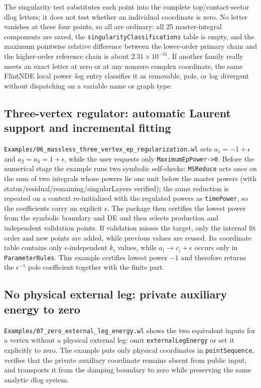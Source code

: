\documentclass[11pt,a4paper]{article}
\begin{document}
The singularity test substitutes each point into the complete top/contact-sector dlog letters; it
does not test whether an individual coordinate is zero. No letter vanishes at these four points,
so all are ordinary: all 25 master-integral components are saved, the
\texttt{singularityClassifications} table is empty, and the maximum pointwise relative difference
between the lower-order primary chain and the higher-order reference chain is about
$2.31\times10^{-31}$. If another family really meets an exact letter at zero or at any nonzero
complex coordinate, the same FlintNDE local power--log entry classifies it as removable, pole, or
log divergent without dispatching on a variable name or graph type.

\subsection{Three-vertex regulator: automatic Laurent support and incremental fitting}

\texttt{Examples/06\_massless\_three\_vertex\_ep\_regularization.wl} sets
$a_1=-1+\epsilon$ and $a_2=a_3=1+\epsilon$, while the user requests only \texttt{MaximumEpPower->0}. Before
the numerical stage the example runs two symbolic self-checks: \texttt{MSReduce} acts once on the sum of
two integrals whose powers lie one unit below the master powers (with
status/residual/remaining/singularLayers verified); the same reduction is repeated on a context
re-initialized with the regulated powers as \texttt{timePower}, so the coefficients carry an explicit
$\epsilon$. The package then
certifies the lowest power from the symbolic boundary and DE and then selects production and
independent validation points. If validation misses the target, only the internal fit order and new
points are added, while previous values are reused. Its coordinate table contains only
$\epsilon$-independent $k_i$ values, while $a_i\to c_i+\epsilon$ occurs only in
\texttt{ParameterRules}. This example certifies lowest power $-1$ and therefore returns the
$\epsilon^{-1}$ pole coefficient together with the finite part.

\subsection{No physical external leg: private auxiliary energy to zero}

\texttt{Examples/07\_zero\_external\_leg\_energy.wl} shows the two equivalent inputs for a
vertex without a physical external leg: omit \texttt{externalLegEnergy} or set it explicitly to
zero.  The example puts only physical coordinates in \texttt{pointSequence}, verifies that the
private auxiliary coordinate remains absent from public input, and transports it from the damping
boundary to zero while preserving the same analytic dlog system.
\end{document}

